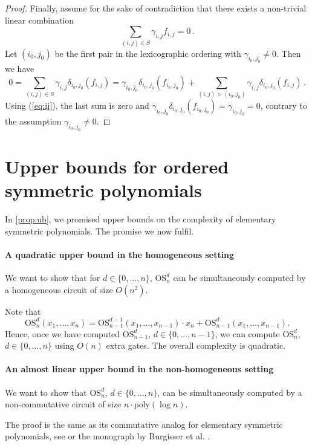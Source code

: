 \documentclass[11pt]{article}
\newcommand{\esym}[2]{\mathrm{OS}_{#1}^{#2}}
\begin{document}
\begin{proof}
  Finally, assume for the sake of contradiction that there exists a non-trivial linear combination 
  \[
    \sum_{(i,j)\in S}  \gamma_{i,j} f_{i,j}=0\,.
  \]
  Let $( i_0,j_0)$ be the first pair in the lexicographic ordering with $\gamma_{i_0,j_0} \neq 0$. 
  Then we have
  \[
    0=\sum_{(i,j)\in S}  \gamma_{i,j} \delta_{i_0,j_0}( f_{i,j})=\gamma_{i_0,j_0} \delta_{i_0,j_0}(f_{i_0,j_0})+\sum_{(i,j)> (i_0,j_0)}  \gamma_{i,j} \delta_{i_0,j_0}(f_{i,j})\,.  
  \]
  Using (\ref{eq:ij}), the last sum is zero and  $\gamma_{i_0,j_0} \delta_{i_0,j_0}(f_{i_0,j_0})= \gamma_{i_0,j_0}=0$,  contrary to the assumption  $\gamma_{i_0,j_0}\not =0$.
\end{proof}

\section{Upper bounds for ordered symmetric polynomials}\label{sec:esym}

In \autoref{prop:ub}, we promised upper bounds on the complexity of elementary symmetric polynomials. 
The promise we now fulfil. 

\paragraph*{A quadratic upper bound in the homogeneous setting}

We want to show that for $d\in \{0,\dots, n\}$, $\esym{n}{d}$ can be simultaneously computed by a homogeneous circuit of size $O(n^2)$.
  
Note that %
\[
  \esym{n}{d}(x_1, \ldots, x_n) = \esym{n-1}{d-1}(x_1, \ldots, x_{n-1}) \cdot x_n + \esym{n-1}{d}(x_1, \ldots, x_{n-1}).
\]
Hence, once we have computed $\esym{n-1}{d}$, $d\in \{0,\dots, n-1\}$, we can compute $\esym{n}{d}$, $d\in \{0,\dots, n\}$ using $O(n)$ extra gates. The overall complexity is quadratic.


\paragraph*{An almost linear upper bound in the non-homogeneous setting}

We want to show that $\esym{n}{d}$, $d\in \{0,\dots, n\}$, can be simultaneously computed by a non-commutative circuit of size $n\cdot \mathrm{poly}(\log n)$. 

The proof is the same as its commutative analog for elementary symmetric polynomials, see \cite{BS83} or the monograph by Burgisser et al. \cite[Chapters  2.1-2.3]{BCS97}. 
\end{document}
